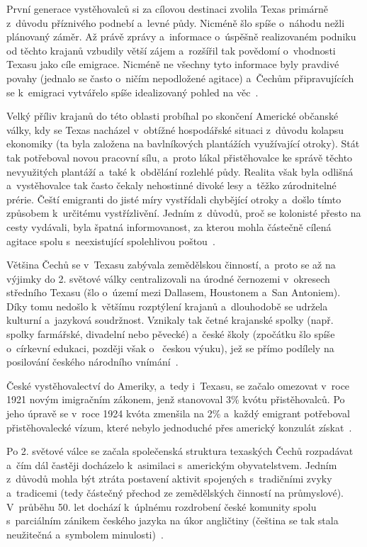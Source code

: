 První generace vystěhovalců si za cílovou destinaci zvolila Texas primárně z~důvodu příznivého podnebí a~levné půdy. Nicméně šlo spíše o~náhodu nežli plánovaný záměr. Až právě zprávy a~informace o~úspěšně realizovaném podniku od těchto krajanů vzbudily větší zájem a~rozšířil tak povědomí o~vhodnosti Texasu jako cíle emigrace. Nicméně ne všechny tyto informace byly pravdivé povahy (jednalo se často o~ničím nepodložené agitace) a~Čechům připravujících se k~emigraci vytvářelo spíše idealizovaný pohled na věc~\parencite{Eckertova2004}.

Velký příliv krajanů do této oblasti probíhal po skončení Americké občanské války, kdy se Texas nacházel v~obtížné hospodářské situaci z~důvodu kolapsu ekonomiky (ta byla založena na bavlníkových plantážích využívající otroky). Stát tak potřeboval novou pracovní sílu, a~proto lákal přistěhovalce ke správě těchto nevyužitých plantáží a~také k~obdělání rozlehlé půdy. Realita však byla odlišná a~vystěhovalce tak často čekaly nehostinné divoké lesy a~těžko zúrodnitelné prérie. Čeští emigranti do jisté míry vystřídali chybějící otroky a~došlo tímto způsobem k~určitému vystřízlivění. Jedním z~důvodů, proč se kolonisté přesto na cesty vydávali, byla špatná informovanost, za kterou mohla částečně cílená agitace spolu s~neexistující spolehlivou poštou~\parencite{Eckertova2004}.

Většina Čechů se v~Texasu zabývala zemědělskou činností, a~proto se až na výjimky do 2. světové války centralizovali na úrodné černozemi v~okresech středního Texasu (šlo o~území mezi Dallasem, Houstonem a~San Antoniem). Díky tomu nedošlo k~většímu rozptýlení krajanů a~dlouhodobě se udržela kulturní a~jazyková soudržnost. Vznikaly tak četné krajanské spolky (např. spolky farmářské, divadelní nebo pěvecké) a~české školy (zpočátku šlo spíše o~církevní edukaci, později však o~ českou výuku), jež se přímo podílely na posilování českého národního vnímání~\parencite{Eckertova2004}.

České vystěhovalectví do Ameriky, a~tedy i~Texasu, se začalo omezovat v~roce 1921 novým imigračním zákonem, jenž stanovoval 3\% kvótu přistěhovalců. Po jeho úpravě se v~roce 1924 kvóta zmenšila na 2\% a~každý emigrant potřeboval přistěhovalecké vízum, které nebylo jednoduché přes americký konzulát získat~\parencite{Vaculik2009b}.

Po 2. světové válce se začala společenská struktura texaských Čechů rozpadávat a~čím dál častěji docházelo k~asimilaci s~americkým obyvatelstvem. Jedním z~důvodů mohla být ztráta postavení aktivit spojených s~tradičními zvyky a~tradicemi (tedy částečný přechod ze zemědělských činností na průmyslové). V~průběhu 50. let dochází k~úplnému rozdrobení české komunity spolu s~parciálním zánikem českého jazyka na úkor angličtiny (čeština se tak stala neužitečná a~symbolem minulosti)~\parencite{Eckertova2004}.

